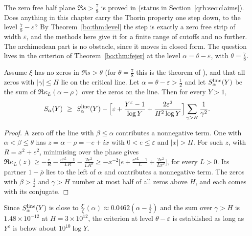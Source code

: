 The zero free half plane $\Re s>\frac78$ is proved in \cite{OAI26a} (status in Section~\ref{qrh:sec:claims}). Does anything in this chapter carry the Thorin property one step down, to the level $\frac78-\varepsilon$? By Theorem~\ref{bo:thm:level} the step is exactly a zero free strip of width $\varepsilon$, and the methods here give it for a finite range of cutoffs and no further. The archimedean part is no obstacle, since it moves in closed form. The question lives in the criterion of Theorem~\ref{bo:thm:fejer} at the level $\alpha=\theta-\varepsilon$, with $\theta=\frac78$.

\begin{proposition}\label{bo:prop:stepbelow}
Assume $\xi$ has no zeros in $\Re s>\theta$ (for $\theta=\frac78$ this is the theorem of \cite{OAI26a}), and that all zeros with $|\gamma|\le H$ lie on the critical line. Let $\alpha=\theta-\varepsilon>\frac12$ and let $S^{\rm line}_\alpha(Y)$ be the sum of $\Re\kappa_L(\alpha-\rho)$ over the zeros on the line. Then for every $Y>1$,
\[
S_\alpha(Y)\ \ge\ S^{\rm line}_\alpha(Y)-\Bigl[\varepsilon+\frac{Y^{\varepsilon}-1}{\log Y}+\frac{2\varepsilon^2}{H^2\log Y}\Bigr]\sum_{\gamma>H}\frac1{\gamma^2}.
\]
\end{proposition}

\begin{proof}
A zero off the line with $\beta\le\alpha$ contributes a nonnegative term. One with $\alpha<\beta\le\theta$ has $z=\alpha-\rho=-e+ix$ with $0<e\le\varepsilon$ and $|x|>H$. For such $z$, with $R=x^2+e^2$, minimising over the phase gives $\Re\kappa_L(z)\ge-\frac eR-\frac{e^{eL}-1}{LR}-\frac{2e^2}{LR^2}\ge-x^{-2}\bigl[e+\frac{e^{eL}-1}L+\frac{2e^2}{Lx^2}\bigr]$, for every $L>0$. Its partner $1-\bar\rho$ lies to the left of $\alpha$ and contributes a nonnegative term. The zeros with $\beta>\frac12$ and $\gamma>H$ number at most half of all zeros above $H$, and each comes with its conjugate.
\end{proof}

Since $S^{\rm line}_\alpha(Y)$ is close to $\frac{\xi'}{\xi}(\alpha)\approx0.0462(\alpha-\frac12)$ and the sum over $\gamma>H$ is $1.48\times10^{-12}$ at $H=3\times10^{12}$, the criterion at level $\theta-\varepsilon$ is established as long as $Y^{\varepsilon}$ is below about $10^{10}\log Y$.

